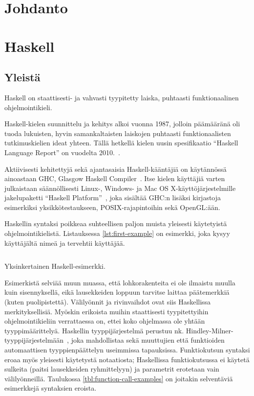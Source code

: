 \section{Johdanto}
\section{Haskell}
\subsection{Yleistä}
Haskell on staattisesti- ja vahvasti tyypitetty laiska, puhtaasti funktionaalinen ohjelmointikieli.

Haskell-kielen suunnittelu ja kehitys alkoi vuonna 1987,
jolloin päämääränä oli tuoda lukuisten, hyvin samankaltaisten laiskojen puhtaasti funktionaalisten tutkimuskielien ideat yhteen.
Tällä hetkellä kielen uusin spesifikaatio ``Haskell Language Report'' on vuodelta 2010.~\cite{HaskellReport2010}.

Aktiivisesti kehitettyjä sekä ajantasaisia Haskell-kääntäjiä on käytännössä ainoastaan
GHC, Glasgow Haskell Compiler~\cite{GHC}.
Itse kielen käyttäjiä varten julkaistaan säännöllisesti Linux-, Windows- ja
Mac OS X-käyttöjärjestelmille  jakelupaketti ``Haskell Platform''~\cite{HaskellPlatform},
joka sisältää GHC:n lisäksi kirjastoja esimerkiksi yksikkötestaukseen, POSIX-rajapintoihin
sekä OpenGL:ään.

Haskellin syntaksi poikkeaa suhteellisen paljon muista yleisesti käytetyistä ohjelmointikielistä.
Listauksessa \ref{lst:first-example} on esimerkki,
joka kysyy käyttäjältä nimeä ja tervehtii käyttäjää.

\begin{listing}[H]
    \inputminted{haskell}{codes/FirstExample.hs}
    \label{lst:first-example}
    \caption{Yksinkertainen Haskell-esimerkki.}
\end{listing}

Esimerkistä selviää muun muassa, että lohkorakenteita ei ole ilmaistu muulla kuin sisennyksellä,
eikä lausekkeiden loppuun tarvitse laittaa päätemerkkiä (kuten puolipistettä).
Välilyönnit ja rivinvaihdot ovat siis Haskellissa merkityksellisiä.
Myöskin erikoista muihin staattisesti tyypitettyihin ohjelmointikieliin verrattaessa on,
ettei koko ohjelmassa ole yhtään tyyppimäärittelyä.
Haskellin tyyppijärjestelmä perustuu nk. Hindley-Milner-tyyppijärjestelmään~\cite{Hindley,Milner},
joka mahdollistaa sekä muuttujien että funktioiden automaattisen tyyppienpäättelyn useimmissa tapauksissa.
Funktiokutsun syntaksi eroaa myös yleisesti käytetystä notaatiosta;
Haskellissa funktiokutsussa ei käytetä sulkeita (paitsi lausekkeiden ryhmittelyyn) ja parametrit erotetaan vain välilyönneillä.
Taulukossa \ref{tbl:function-call-examples} on joitakin selventäviä esimerkkejä syntaksien eroista.

